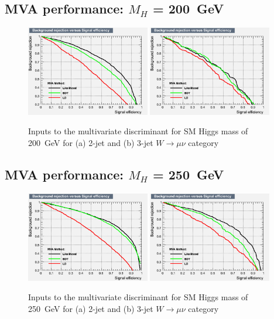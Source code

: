 \subsection{MVA performance: \texorpdfstring{$M_H$}{M(H)} = 200~GeV}
\begin{figure}[ht]
  \centering
  \includegraphics[width=0.48\textwidth]{figs/TMVA_200_nJ2_mu_rejBvsS}
  \includegraphics[width=0.48\textwidth]{figs/TMVA_200_nJ3_mu_rejBvsS}	
  \caption{\label{fig:perf200mu}Inputs to the multivariate discriminant for SM Higgs mass of 200~GeV for (a) 2-jet and (b) 3-jet $W\to\mu\nu$ category}
\end{figure}
\newpage
\subsection{MVA performance: \texorpdfstring{$M_H$}{M(H)} = 250~GeV}
\begin{figure}[ht]
  \centering
  \includegraphics[width=0.48\textwidth]{figs/TMVA_250_nJ2_mu_rejBvsS}
  \includegraphics[width=0.48\textwidth]{figs/TMVA_250_nJ3_mu_rejBvsS}	
  \caption{\label{fig:perf250mu}Inputs to the multivariate discriminant for SM Higgs mass of 250~GeV for (a) 2-jet and (b) 3-jet $W\to\mu\nu$ category}
\end{figure}
